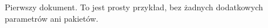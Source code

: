 \documentclass{article}
\begin{document}
	Pierwszy dokument. To jest prosty przykład, bez żadnych dodatkowych
	parametrów ani pakietów.
\end{document}
